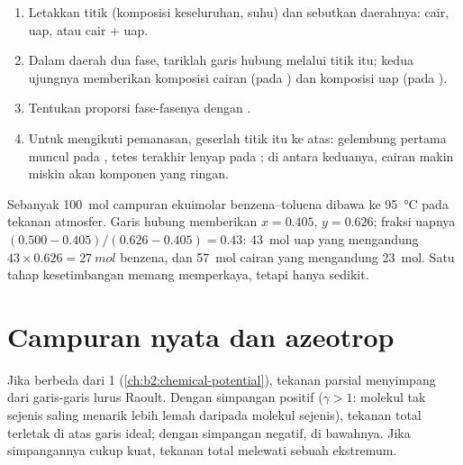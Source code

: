 \begin{method}\label{met:b2:liquid-vapour-diagrams:read-diagram}
\begin{enumerate}
  \item Letakkan titik (komposisi keseluruhan, suhu) dan sebutkan daerahnya:
        cair, uap, atau cair + uap.
  \item Dalam daerah dua fase, tariklah garis hubung melalui titik itu;
        kedua ujungnya memberikan komposisi cairan (pada )
        dan komposisi uap (pada ).
  \item Tentukan proporsi fase-fasenya dengan .
  \item Untuk mengikuti pemanasan, geserlah titik itu ke atas: gelembung
        pertama muncul pada , tetes terakhir lenyap pada
        ; di antara keduanya, cairan makin miskin akan komponen
        yang ringan.
\end{enumerate}
\end{method}

\begin{example}\label{ex:b2:liquid-vapour-diagrams:flash}
Sebanyak \qty{100}{mol} campuran ekuimolar benzena--toluena dibawa ke
\qty{95}{\degreeCelsius} pada tekanan atmosfer. Garis hubung memberikan
$x =
0.405$, $y = 0.626$; fraksi uapnya
$(0.500 - 0.405)/(0.626 - 0.405) =
0.43$: \qty{43}{mol} uap yang
mengandung $43 \times 0.626 = \qty{27}{mol}$ benzena, dan \qty{57}{mol}
cairan yang mengandung \qty{23}{mol}. Satu tahap kesetimbangan memang
memperkaya, tetapi hanya sedikit.
\end{example}

\section{Campuran nyata dan azeotrop}

Jika  berbeda dari 1 (\cref{ch:b2:chemical-potential}),
tekanan parsial menyimpang dari garis-garis lurus Raoult. Dengan simpangan
positif ($\gamma > 1$: molekul tak sejenis saling menarik lebih lemah
daripada molekul sejenis), tekanan total terletak di atas garis ideal;
dengan simpangan negatif, di bawahnya. Jika simpangannya cukup kuat,
tekanan total melewati sebuah ekstremum.

